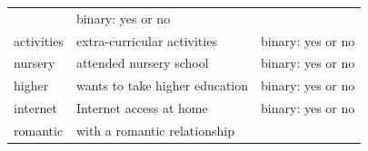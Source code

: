 \documentclass[]{article}
\begin{document}
\begin{longtable}[]{@{}lll@{}}
\begin{minipage}[t]{0.28\columnwidth}
\end{minipage} & \begin{minipage}[t]{0.58\columnwidth}\raggedright
binary: yes or no\strut
\end{minipage}\tabularnewline
\begin{minipage}[t]{0.05\columnwidth}\raggedright
activities\strut
\end{minipage} & \begin{minipage}[t]{0.28\columnwidth}\raggedright
extra-curricular activities\strut
\end{minipage} & \begin{minipage}[t]{0.58\columnwidth}\raggedright
binary: yes or no\strut
\end{minipage}\tabularnewline
\begin{minipage}[t]{0.05\columnwidth}\raggedright
nursery\strut
\end{minipage} & \begin{minipage}[t]{0.28\columnwidth}\raggedright
attended nursery school\strut
\end{minipage} & \begin{minipage}[t]{0.58\columnwidth}\raggedright
binary: yes or no\strut
\end{minipage}\tabularnewline
\begin{minipage}[t]{0.05\columnwidth}\raggedright
higher\strut
\end{minipage} & \begin{minipage}[t]{0.28\columnwidth}\raggedright
wants to take higher education\strut
\end{minipage} & \begin{minipage}[t]{0.58\columnwidth}\raggedright
binary: yes or no\strut
\end{minipage}\tabularnewline
\begin{minipage}[t]{0.05\columnwidth}\raggedright
internet\strut
\end{minipage} & \begin{minipage}[t]{0.28\columnwidth}\raggedright
Internet access at home\strut
\end{minipage} & \begin{minipage}[t]{0.58\columnwidth}\raggedright
binary: yes or no\strut
\end{minipage}\tabularnewline
\begin{minipage}[t]{0.05\columnwidth}\raggedright
romantic\strut
\end{minipage} & \begin{minipage}[t]{0.28\columnwidth}\raggedright
with a romantic relationship\strut

\end{minipage}
\end{longtable}
\end{document}
